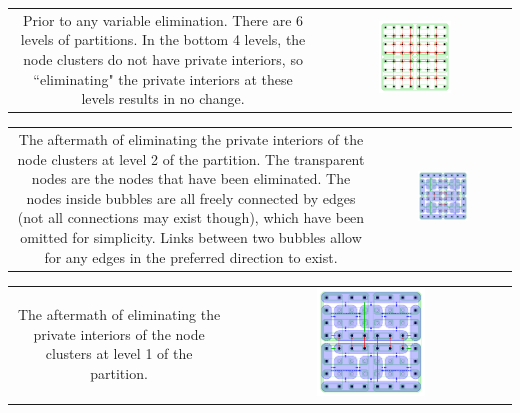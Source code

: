 \documentclass{article}
\begin{document}
\begin{center}
\begin{tabular}{cc} 
\parbox{0.5\textwidth}{ 
Prior to any variable elimination. There are 6 levels of partitions. In the bottom 4 levels, the node clusters do not have private interiors, so ``eliminating" the private interiors at these levels results in no change.  
} & \parbox{0.4\textwidth}{\includegraphics[width = 0.4\textwidth]{example_nested_dissection/example_nested_dissection_elimination_panel_1}} 
\end{tabular}

\begin{tabular}{cc}
\parbox{0.5\textwidth}{ 
The aftermath of eliminating the private interiors of the node clusters at level 2 of the partition. The transparent nodes are the nodes that have been eliminated. The nodes inside bubbles are all freely connected by edges (not all connections may exist though), which have been omitted for simplicity. Links between two bubbles allow for any edges in the preferred direction to exist.   
} & \parbox{0.4\textwidth}{\includegraphics[width = 0.4\textwidth]{example_nested_dissection/example_nested_dissection_elimination_panel_2}} 
\end{tabular}

\begin{tabular}{cc}
\parbox{0.5\textwidth}{ 
The aftermath of eliminating the private interiors of the node clusters at level 1 of the partition.  
} & \parbox{0.4\textwidth}{\includegraphics[width = 0.4\textwidth]{example_nested_dissection/example_nested_dissection_elimination_panel_3}} 
\end{tabular}


\end{center}
\end{document}
